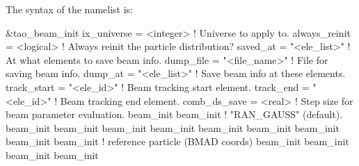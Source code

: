 {{{{{{{{{{{The syntax of the  namelist is:
\begin{example}
  &tao_beam_init
    ix_universe               = <integer>     ! Universe to apply to.
    always_reinit             = <logical>     ! Always reinit the particle distribution?
    saved_at                  = "<ele_list>"  ! At what elements to save beam info.
    dump_file                 = "<file_name>" ! File for saving beam info.
    dump_at                   = "<ele_list>"  ! Save beam info at these elements.
    track_start               = "<ele_id>"    ! Beam tracking start element.
    track_end                 = "<ele_id>"    ! Beam tracking end element.
    comb_ds_save              = <real>        ! Step size for beam parameter evaluation.
    beam_init%
    beam_init%
                                              !   "RAN_GAUSS" (default).
    beam_init%
    beam_init%
    beam_init%
    beam_init%
    beam_init%
    beam_init%
    beam_init%
    beam_init%
    beam_init%
                                              !   reference particle (BMAD coords)
    beam_init%
    beam_init%
    beam_init%
    beam_init%

\end{example}}}}}}}}}}}}
